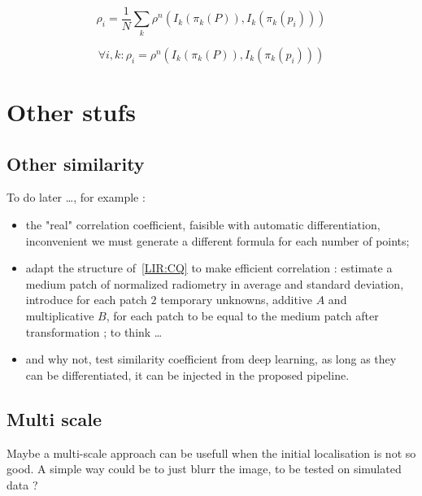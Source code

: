 \begin{equation}
     \rho_i = \frac{1}{N} \sum_k \rho^n(I_k(\pi_k(P)), I_k(\pi_k(p_i)))  \label{Eq:RIM:EstRho}
\end{equation}

\begin{equation}
      \forall i,k : \rho_i =  \rho^n(I_k(\pi_k(P)), I_k(\pi_k(p_i)))   \label{Eq:RIM:EqRho}
\end{equation}




\section{Other stufs}

\subsection{Other similarity}
\label{LIR:OthSim}

To do later \dots , for example :

\begin{itemize}
    \item the "real" correlation coefficient, faisible with automatic differentiation,
          inconvenient we must generate a different formula for each number of points;

    \item adapt the structure of~\ref{LIR:CQ} to make efficient correlation :
          estimate a medium   patch of normalized radiometry in average and standard deviation,
          introduce  for each patch $2$ temporary unknowns, additive $A$ and multiplicative $B$,
          for each patch to be equal to the medium patch after transformation ;
          to think \dots

    \item and why not, test similarity coefficient from deep learning, as long as they can
          be differentiated, it can be injected in the proposed pipeline.
\end{itemize}

\subsection{Multi scale}
Maybe a multi-scale approach can be usefull when the initial localisation is not so good. A simple
way could be to just blurr the image, to be tested on simulated data ?


